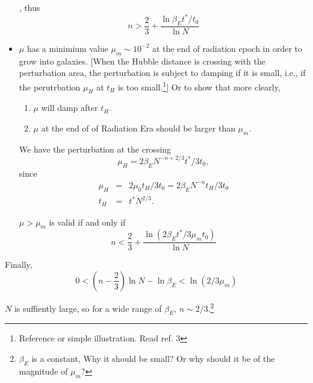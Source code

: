 \begin{itemize}
{%
}, thus 
\begin{equation}
n>\frac{2}{3}+\frac{\ln{\beta_E t^*/t_0}}{\ln{N}}
\end{equation}




\vspace{2em}
\item $\mu$ has a minimium value $\mu_m\sim  10^{-2}$ at the end of radiation epoch in order to grow into galaxies.
[When the Hubble distance is crossing with the perturbation area, the perturbation is subject to damping if it is small, i.e., if the perutrbation $\mu_H$ at $t_H$ is too small.\footnote{Reference or simple illustration. Read ref. 3}] Or to show that more clearly, 
\begin{enumerate}
\item 
$\mu$ will damp after $t_H$.
\item
$\mu$ at the end of of Radiation Era should be larger than $\mu_m$.
\end{enumerate}

\vspace{2em}
We have the perturbation at the crossing
\begin{equation}\mu_H=2\beta_E N^{-n+2/3}t^*/3t_0,
\end{equation}
since
\begin{eqnarray*}
\mu_H&=&2\mu_0 t_H/3t_0=2\beta_E N^{-n} t_H/3t_0    \\
t_H&=&t^* N^{2/3}.
\end{eqnarray*}


$\mu>\mu_m$ is valid if and only if
\begin{equation}
n<\frac 2 3+\frac{\ln{(2\beta_E t^*/3\mu_m t_0)}}{\ln N}
\end{equation}

\end{itemize}

\vspace{2em}

Finally, 
\begin{equation}
0<(n-\frac{2}{3})\ln N-\ln \beta_E<\ln{(2/3\mu_m)}
\end{equation}

$N$ is suffiently large, so for a wide range of $\beta_E$, $n\sim 2/3$.\footnote{
$\beta_E$ is a constant, Why it should be small? Or why should it be of the magnitude of $\mu_m$?
}




